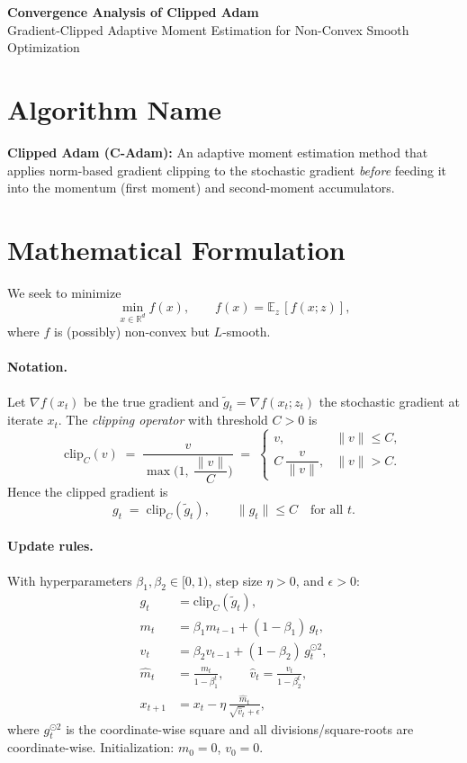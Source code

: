 \documentclass[11pt]{article}
\begin{document}
\begin{center}
{\LARGE \textbf{Convergence Analysis of Clipped Adam}}\\[4pt]
{\large Gradient-Clipped Adaptive Moment Estimation for Non-Convex Smooth Optimization}
\end{center}

\section*{Algorithm Name}
\textbf{Clipped Adam (C-Adam):} An adaptive moment estimation method that applies
norm-based gradient clipping to the stochastic gradient \emph{before} feeding it into
the momentum (first moment) and second-moment accumulators.

\section*{Mathematical Formulation}

We seek to minimize
\[
\min_{x\in\mathbb{R}^d} f(x), \qquad f(x) = \mathbb{E}_{z}\,[f(x;z)],
\]
where $f$ is (possibly) non-convex but $L$-smooth.

\paragraph{Notation.}
Let $\nabla f(x_t)$ be the true gradient and $\widetilde g_t = \nabla f(x_t; z_t)$ the
stochastic gradient at iterate $x_t$. The \emph{clipping operator} with threshold $C>0$ is
\[
\mathrm{clip}_C(v) \;=\; \frac{v}{\max\!\Big(1,\ \dfrac{\|v\|}{C}\Big)}
\;=\;
\begin{cases}
v, & \|v\|\le C,\\[6pt]
C\,\dfrac{v}{\|v\|}, & \|v\| > C.
\end{cases}
\]
Hence the clipped gradient is
\[
g_t \;=\; \mathrm{clip}_C(\widetilde g_t), \qquad \|g_t\|\le C \quad\text{for all }t.
\]

\paragraph{Update rules.}
With hyperparameters $\beta_1,\beta_2\in[0,1)$, step size $\eta>0$, and $\epsilon>0$:
\begin{align}
g_t      &= \mathrm{clip}_C(\widetilde g_t), \label{eq:clip}\\
m_t      &= \beta_1 m_{t-1} + (1-\beta_1)\, g_t, \label{eq:m}\\
v_t      &= \beta_2 v_{t-1} + (1-\beta_2)\, g_t^{\odot 2}, \label{eq:v}\\
\hat m_t &= \frac{m_t}{1-\beta_1^t}, \qquad
\hat v_t = \frac{v_t}{1-\beta_2^t}, \label{eq:bias}\\
x_{t+1}  &= x_t - \eta\, \frac{\hat m_t}{\sqrt{\hat v_t}+\epsilon}, \label{eq:update}
\end{align}
where $g_t^{\odot 2}$ is the coordinate-wise square and all divisions/square-roots are
coordinate-wise. Initialization: $m_0 = 0$, $v_0 = 0$.
\end{document}
